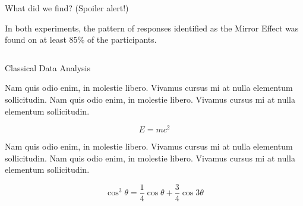 \documentclass[final]{beamer}
\newlength{\onecolwid}
\newlength{\twocolwid}
\begin{document}
\begin{frame}[t]
\begin{columns}[t]
\begin{column}{\twocolwid}
\begin{columns}[t,totalwidth=\twocolwid]
\begin{column}{\onecolwid}
\end{column} %

\end{columns} %


\begin{alertblock}{What did we find? (Spoiler alert!)}

In both experiments, the pattern of responses identified as the Mirror Effect was found on at least 85\% of the participants.

\end{alertblock} 


\begin{columns}[t,totalwidth=\twocolwid] %

\begin{column}{\onecolwid} %


\begin{block}{Classical Data Analysis}

Nam quis odio enim, in molestie libero. Vivamus cursus mi at nulla elementum sollicitudin. Nam quis odio enim, in molestie libero. Vivamus cursus mi at nulla elementum sollicitudin.
  
\begin{equation}
E = mc^{2}
\label{eqn:Einstein}
\end{equation}

Nam quis odio enim, in molestie libero. Vivamus cursus mi at nulla elementum sollicitudin. Nam quis odio enim, in molestie libero. Vivamus cursus mi at nulla elementum sollicitudin.

\begin{equation}
\cos^3 \theta =\frac{1}{4}\cos\theta+\frac{3}{4}\cos 3\theta
\label{eq:refname}
\end{equation}


\end{block}
\end{column}
\end{columns}
\end{column}
\end{columns}
\end{frame}
\end{document}
